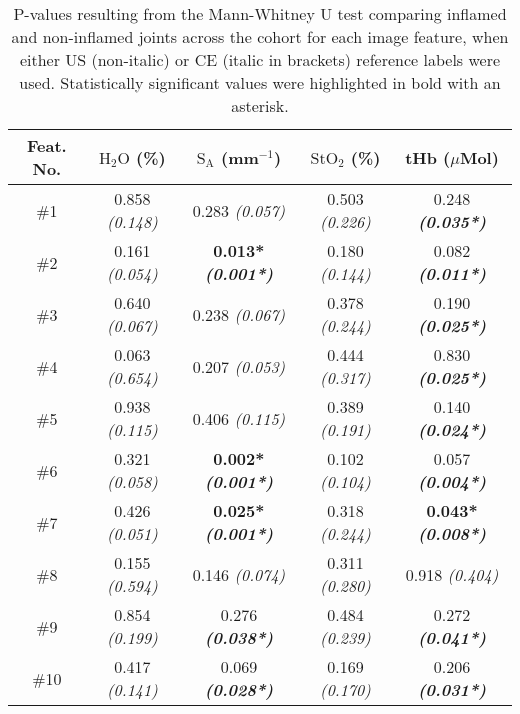 \documentclass[twoside]{bhamthesis}
\theoremstyle{definition}
\begin{document}

\begin{table}[!ht]
\small
\caption{P-values resulting from the Mann-Whitney U test comparing inflamed and non-inflamed joints across the cohort for each image feature, when either US (non-italic) or CE (italic in brackets) reference labels were used. Statistically significant values were highlighted in bold with an asterisk.} 
\label{tab:Diseased p values}
\begin{center}       
\begin{tabular}{|c| c c c c|}
\hline
\rule[-1ex]{0pt}{3.5ex}  Feat. No. & $\mathrm{H_2O}$ (\%) & $\mathrm{S_A}$ (mm$^{-1}$) &  $\mathrm{StO_2}$ (\%) & tHb ($\mu$Mol)\\
\hline
\rule[-1ex]{0pt}{3.5ex}  \#1 & 0.858 \textit{(0.148)} & 0.283 \textit{(0.057)} & 0.503 \textit{(0.226)} & 0.248 \textbf{\textit{(0.035*)}} \\
\rule[-1ex]{0pt}{3.5ex}  \#2 & 0.161 \textit{(0.054)} & \textbf{0.013*} \textbf{\textit{(0.001*)}} & 0.180 \textit{(0.144)} & 0.082 \textbf{\textit{(0.011*)}} \\ 
\rule[-1ex]{0pt}{3.5ex}  \#3 & 0.640 \textit{(0.067)} & 0.238 \textit{(0.067)} & 0.378 \textit{(0.244)} & 0.190 \textbf{\textit{(0.025*)}} \\
\rule[-1ex]{0pt}{3.5ex}  \#4 & 0.063 \textit{(0.654)} & 0.207 \textit{(0.053)} & 0.444 \textit{(0.317)} & 0.830 \textbf{\textit{(0.025*)}} \\
\rule[-1ex]{0pt}{3.5ex}  \#5 & 0.938 \textit{(0.115)} & 0.406 \textit{(0.115)} & 0.389 \textit{(0.191)} & 0.140 \textbf{\textit{(0.024*)}} \\
\rule[-1ex]{0pt}{3.5ex}  \#6 & 0.321 \textit{(0.058)} & \textbf{0.002*} \textbf{\textit{(0.001*)}} & 0.102 \textit{(0.104)} & 0.057 \textbf{\textit{(0.004*)}} \\ 
\rule[-1ex]{0pt}{3.5ex}  \#7 & 0.426 \textit{(0.051)} & \textbf{0.025*}\textbf{ \textit{(0.001*)}} & 0.318 \textit{(0.244)} & \textbf{0.043*} \textbf{\textit{(0.008*)}} \\
\rule[-1ex]{0pt}{3.5ex}  \#8 & 0.155 \textit{(0.594)} & 0.146 \textit{(0.074)} & 0.311 \textit{(0.280)} & 0.918 \textit{(0.404)} \\
\rule[-1ex]{0pt}{3.5ex}  \#9 & 0.854 \textit{(0.199)} & 0.276 \textbf{\textit{(0.038*)}} & 0.484 \textit{(0.239)} & 0.272 \textbf{\textit{(0.041*)}} \\
\rule[-1ex]{0pt}{3.5ex}  \#10 & 0.417 \textit{(0.141)} & 0.069 \textbf{\textit{(0.028*)}} & 0.169 \textit{(0.170)} & 0.206 \textbf{\textit{(0.031*)}} \\ 

\end{tabular}
\end{center}
\end{table}
\end{document}

